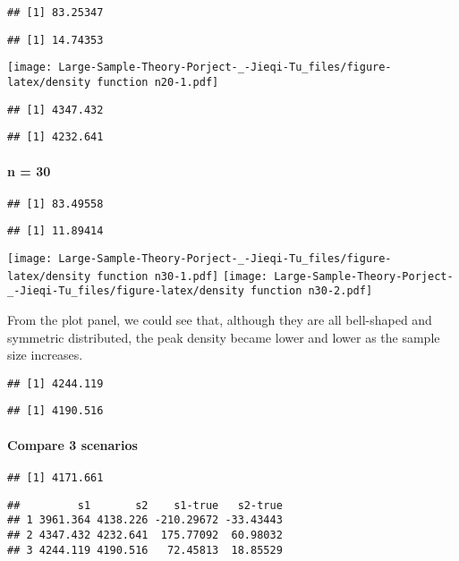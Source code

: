 \documentclass[]{article}
\let\oldparagraph\paragraph
\renewcommand{\paragraph}[1]{\oldparagraph{#1}\mbox{}}
\begin{document}
\begin{verbatim}
## [1] 83.25347
\end{verbatim}

\begin{verbatim}
## [1] 14.74353
\end{verbatim}

\texttt{[image: Large-Sample-Theory-Porject-\_-Jieqi-Tu\_files/figure-latex/density function n20-1.pdf]}

\begin{verbatim}
## [1] 4347.432
\end{verbatim}

\begin{verbatim}
## [1] 4232.641
\end{verbatim}

\hypertarget{n-30}{%
\paragraph{n = 30}\label{n-30}}

\begin{verbatim}
## [1] 83.49558
\end{verbatim}

\begin{verbatim}
## [1] 11.89414
\end{verbatim}

\texttt{[image: Large-Sample-Theory-Porject-\_-Jieqi-Tu\_files/figure-latex/density function n30-1.pdf]}
\texttt{[image: Large-Sample-Theory-Porject-\_-Jieqi-Tu\_files/figure-latex/density function n30-2.pdf]}

From the plot panel, we could see that, although they are all
bell-shaped and symmetric distributed, the peak density became lower and
lower as the sample size increases.

\begin{verbatim}
## [1] 4244.119
\end{verbatim}

\begin{verbatim}
## [1] 4190.516
\end{verbatim}

\hypertarget{compare-3-scenarios}{%
\paragraph{Compare 3 scenarios}\label{compare-3-scenarios}}

\begin{verbatim}
## [1] 4171.661
\end{verbatim}

\begin{verbatim}
##         s1       s2    s1-true   s2-true
## 1 3961.364 4138.226 -210.29672 -33.43443
## 2 4347.432 4232.641  175.77092  60.98032
## 3 4244.119 4190.516   72.45813  18.85529
\end{verbatim}
\end{document}
